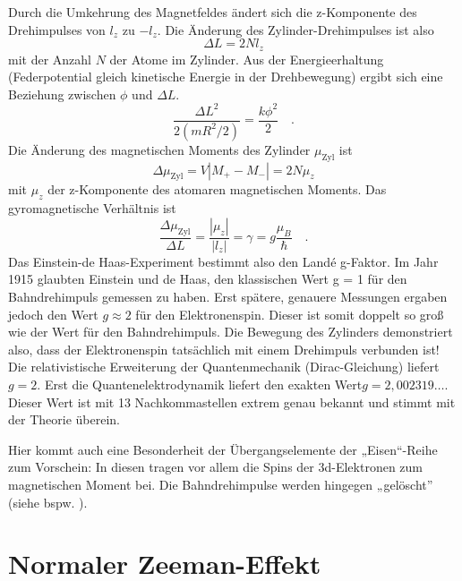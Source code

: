 Durch die Umkehrung des Magnetfeldes ändert sich die z-Komponente des Drehimpulses von $l_z$ zu $-l_z$. Die Änderung des Zylinder-Drehimpulses ist also 
\begin{equation}
    \Delta L = 2 N l_z
\end{equation}
mit der Anzahl $N$ der Atome im Zylinder. Aus der Energieerhaltung (Federpotential gleich kinetische Energie in der Drehbewegung) ergibt sich eine Beziehung zwischen $\phi$ und $\Delta L$.
\begin{equation}
\frac{\Delta L ^2}{2 (mR^2/2)} = \frac{k \phi^2}{2}    \quad .  
\end{equation}
Die Änderung des magnetischen  Moments des Zylinder $\mu_\text{Zyl}$ ist
\begin{equation}
   \Delta  \mu_\text{Zyl} = V | M_+ - M_-| = 2 N \mu_z
\end{equation}
mit $\mu_z$ der z-Komponente des atomaren magnetischen Moments. Das gyromagnetische Verhältnis ist
\begin{equation}
    \frac{ \Delta  \mu_\text{Zyl}}{\Delta L}
    = \frac{|\mu_z|}{|l_z|} = \gamma = g \frac{\mu_B}{\hbar}  \quad .
\end{equation}
Das Einstein-de Haas-Experiment bestimmt also den Landé g-Faktor. 
Im Jahr 1915 glaubten Einstein und de Haas, den klassischen Wert g = 1 für den Bahndrehimpuls gemessen zu haben. Erst spätere, genauere Messungen ergaben jedoch den Wert $g \approx 2$ für den Elektronenspin. Dieser ist somit doppelt so groß wie der Wert für den Bahndrehimpuls.  Die Bewegung des Zylinders demonstriert also, dass der Elektronenspin tatsächlich mit einem Drehimpuls verbunden ist! 
Die relativistische Erweiterung der Quantenmechanik (Dirac-Gleichung) liefert $g = 2$. Erst die Quantenelektrodynamik liefert den exakten Wert$g=2,002319\dots$. Dieser Wert ist mit 13 Nachkommastellen extrem genau bekannt und stimmt mit der Theorie überein.

Hier kommt auch eine Besonderheit der Übergangselemente der „Eisen“-Reihe zum Vorschein: In diesen tragen vor allem die Spins der 3d-Elektronen zum magnetischen Moment bei.  Die Bahndrehimpulse werden hingegen „gelöscht” (siehe bspw. \cite{Hunklinger2014}).





\section{Normaler Zeeman-Effekt}

